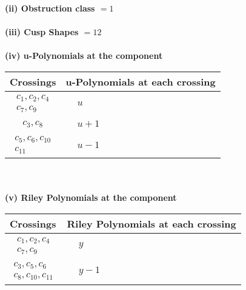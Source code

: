 \documentclass[1p]{elsarticle_modified}
\theoremstyle{definition}
\begin{document}
\flushleft \textbf{(ii) Obstruction class $= 1$}\\~\\
\flushleft \textbf{(iii) Cusp Shapes $= 12$}\\~\\
\newpage\renewcommand{\arraystretch}{1}
\flushleft \textbf{(iv) u-Polynomials at the component}\newline \\
\begin{tabular}{m{50pt}|m{274pt}}
Crossings & \hspace{64pt}u-Polynomials at each crossing \\
\hline $$\begin{aligned}c_{1},c_{2},c_{4}\\c_{7},c_{9}\end{aligned}$$&$\begin{aligned}
&u
\end{aligned}$\\
\hline $$\begin{aligned}c_{3},c_{8}\end{aligned}$$&$\begin{aligned}
&u+1
\end{aligned}$\\
\hline $$\begin{aligned}c_{5},c_{6},c_{10}\\c_{11}\end{aligned}$$&$\begin{aligned}
&u-1
\end{aligned}$\\
\hline
\end{tabular}\\~\\
\newpage\renewcommand{\arraystretch}{1}
\flushleft \textbf{(v) Riley Polynomials at the component}\newline \\
\begin{tabular}{m{50pt}|m{274pt}}
Crossings & \hspace{64pt}Riley Polynomials at each crossing \\
\hline $$\begin{aligned}c_{1},c_{2},c_{4}\\c_{7},c_{9}\end{aligned}$$&$\begin{aligned}
&y
\end{aligned}$\\
\hline $$\begin{aligned}c_{3},c_{5},c_{6}\\c_{8},c_{10},c_{11}\end{aligned}$$&$\begin{aligned}
&y-1
\end{aligned}$\\
\hline
\end{tabular}\\~\\
\end{document}
